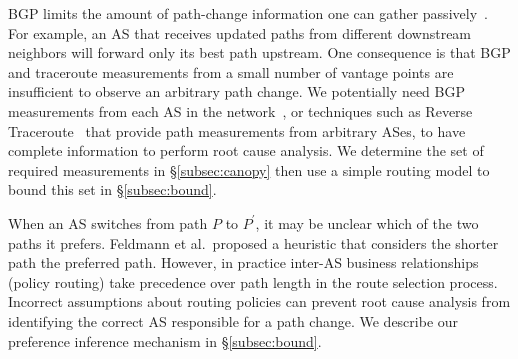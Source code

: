   BGP limits the amount of path-change 
information one can gather passively~\cite{routeviews, bgpmon}. For example, 
an AS that receives updated paths from different
downstream neighbors will forward only its best path upstream. One
consequence is that BGP and traceroute measurements from a small number of 
vantage points are insufficient to observe an arbitrary path change. 
We potentially need BGP measurements from each AS
in the network~\cite{teixeira04omni}, or techniques such as Reverse Traceroute~\cite{revtr} that provide path
measurements from arbitrary ASes, to have complete
information to perform root cause analysis.  We determine the set of
required measurements in 
\S\ref{subsec:canopy} then use a simple routing model to bound this set
in \S\ref{subsec:bound}.

  When an AS switches from path
$P$ to $P^\prime$, it may be unclear which of the two paths it prefers.
Feldmann et al.~proposed a heuristic that considers the
shorter path the preferred path. However, in practice inter-AS business
relationships (\ie policy routing) take precedence over path length in
the route selection process. Incorrect assumptions about routing policies 
can prevent root cause analysis from identifying the correct AS responsible for 
a path change. We describe our preference inference mechanism in
\S\ref{subsec:bound}.

